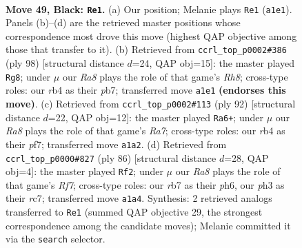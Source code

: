 \documentclass[11pt]{article}
\begin{document}
\clearpage

\begin{figure}[p]\centering
\begin{subfigure}{0.46\textwidth}\centering
\resizebox{\linewidth}{!}{%
\newchessgame
\chessboard[
  setfen={8/1R3p2/p3pk2/8/PR2P3/5P1P/6K1/r7 b - - 5 49},
  showmover=false,
  pgfstyle=straightmove, color=movearrow, markmove={a1-e1}
]}
\caption{}
\end{subfigure}\hfill
\begin{subfigure}{0.46\textwidth}\centering
\resizebox{\linewidth}{!}{%
\newchessgame
\chessboard[
  setfen={7R/1p3r1p/1P2k1p1/4p3/6PP/4KP2/8/8 w - - 11 50},
  showmover=false,
  pgfstyle=straightmove, color=movearrow, markmove={h8-g8}
]}
\caption{}
\end{subfigure}
\\[4pt]
\begin{subfigure}{0.46\textwidth}\centering
\resizebox{\linewidth}{!}{%
\newchessgame
\chessboard[
  setfen={8/R4p2/6k1/p4r1p/5P2/6PK/7P/8 w - - 2 47},
  showmover=false,
  pgfstyle=straightmove, color=movearrow, markmove={a7-a6}
]}
\caption{}
\end{subfigure}\hfill
\begin{subfigure}{0.46\textwidth}\centering
\resizebox{\linewidth}{!}{%
\newchessgame
\chessboard[
  setfen={3R4/2r2R2/p1r4p/1p2k3/1P6/P7/1KP5/8 w - - 8 44},
  showmover=false,
  pgfstyle=straightmove, color=movearrow, markmove={f7-f2}
]}
\caption{}
\end{subfigure}
\caption{\textbf{Move 49, Black: \texttt{Re1}.} (a) Our position; Melanie plays \texttt{Re1} (\texttt{a1e1}). Panels (b)--(d) are the retrieved master positions whose correspondence most drove this move (highest QAP objective among those that transfer to it). (b) Retrieved from \texttt{ccrl\_top\_p0002\#386} (ply 98) [structural distance $d$=24, QAP obj=15]: the master played \texttt{Rg8}; under $\mu$ our \emph{Ra8} plays the role of that game's \emph{Rh8}; cross-type roles: our \emph{r}b4 as their \emph{p}b7; transferred move \texttt{a1e1} \textbf{(endorses this move)}. (c) Retrieved from \texttt{ccrl\_top\_p0002\#113} (ply 92) [structural distance $d$=22, QAP obj=12]: the master played \texttt{Ra6+}; under $\mu$ our \emph{Ra8} plays the role of that game's \emph{Ra7}; cross-type roles: our \emph{r}b4 as their \emph{p}f7; transferred move \texttt{a1a2}. (d) Retrieved from \texttt{ccrl\_top\_p0000\#827} (ply 86) [structural distance $d$=28, QAP obj=4]: the master played \texttt{Rf2}; under $\mu$ our \emph{Ra8} plays the role of that game's \emph{Rf7}; cross-type roles: our \emph{r}b7 as their \emph{p}h6, our \emph{p}h3 as their \emph{r}c7; transferred move \texttt{a1a4}. Synthesis: 2 retrieved analogs transferred to \texttt{Re1} (summed QAP objective 29, the strongest correspondence among the candidate moves); Melanie committed it via the \texttt{search} selector.}
\label{fig:thought-m97}
\end{figure}
\end{document}
